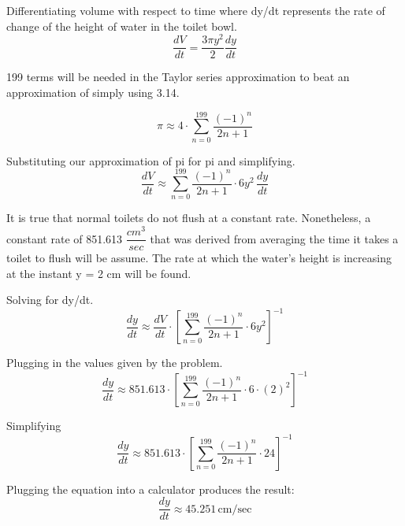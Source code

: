 \documentclass[12pt, titlepage]{article}
\begin{document}
Differentiating volume with respect to time where dy/dt represents the rate of change of the height of water in the toilet bowl.
\begin{equation}
  \frac{dV}{dt} = \frac{3 \pi y^2}{2} \frac{dy}{dt}
\end{equation}

199 terms will be needed in the Taylor series approximation to beat an approximation of simply using 3.14.

\begin{equation}
  \pi \approx 4 \cdot \sum_{n=0}^{199}{\frac{(-1)^n}{2n+1}}
\end{equation}

Substituting our approximation of pi for pi and simplifying.
\begin{equation}
  \frac{dV}{dt} \approx \sum_{n=0}^{199}{\frac{(-1)^n}{2n+1}}  \cdot 6y^{2} \,\frac{dy}{dt}
\end{equation}

It is true that normal toilets do not flush at a constant rate. Nonetheless,  a constant rate of 851.613 \(\dfrac{cm^{3}}{sec}\) that was derived from averaging the time it takes a toilet to flush will be assume. The rate at which the water's height is increasing at the instant y = 2 cm will be found.

Solving for dy/dt.
\begin{equation}
  \frac{dy}{dt} \approx \frac{dV}{dt} \cdot [\sum_{n=0}^{199}{ \frac{(-1)^n}{2n+1} }  \cdot 6y^{2}]^{-1}
\end{equation}

Plugging in the values given by the problem.
\begin{equation}
  \frac{dy}{dt} \approx 851.613 \cdot  [\sum_{n=0}^{199}{ \frac{(-1)^n}{2n+1} }  \cdot 6 \cdot (2)^{2}]^{-1}
\end{equation}

Simplifying
\begin{equation}
  \frac{dy}{dt} \approx 851.613 \cdot  [\sum_{n=0}^{199}{ \frac{(-1)^n}{2n+1} }  \cdot 24]^{-1}
\end{equation}

Plugging the equation into a calculator produces the result:
\begin{equation}
  \frac{dy}{dt} \approx 45.251 \,\textrm{cm/sec}
\end{equation}
\end{document}
